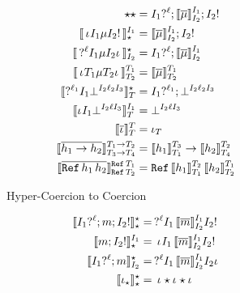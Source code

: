 \documentclass[acmtog, authorversion, acmlarge]{acmart}
\begin{document}
\begin{figure}[b]
\begin{subfigure}{.5\textwidth}
\begin{align*}
             {\Dyn} {\Dyn}
      &=
      \Seq{\prj[\I_1]{\Lbl}}
          {\Seq{\interpm{\Med}{\I_1}{\I_2}}{\inj[\I_2]}}
      \\
      \interp{\hc{\pmt}{\I_1}{\Med}{\I_2}{\inj}}{\I_1}{\Dyn}
      &=
      \Seq{\interpm{\Med}{\I_1}{\I_2}}{\inj[\I_2]}
      \\
      \interp{\hc{\prj{\Lbl}}{\I_1}{\Med}{\I_2}{\imt}}
             {\Dyn}{\I_2}
      &=
      \Seq{\prj[\I_1]{\Lbl}}{\interpm{\Med}{\I_1}{\I_2}}
      \\
      \interp{\hc{\pmt}{\T_1}{\Med}{\T_2}{\imt}}{\T_1}{\T_2}
      &= \interpm{\Med}{\T_1}{\T_2}
      \\
      \interp{\hcfail{\prj{\Lbl_1}}{\I_1}{\I_2}{\Lbl_2}{\I_3}}
             {\Dyn}{\T}
      &=
      \Seq{\prj[\I_1]{\Lbl_1}}{\failed{\I_2}{\Lbl_2}{\I_3}}
      \\
      \interp{\hcfail{\pmt}{\I_1}{\I_2}{\Lbl}{\I_3}}
             {\I_1}{\T}
             &=
      \failed{\I_2}{\Lbl}{\I_3}
      \\
      \interpm{\id}{\T}{\T} &= \id[\T]
      \\
      \interpm{\fn{\HC_1}{\HC_2}}
             {\Fn{\T_1}{\T_2}}{\Fn{\T_3}{\T_4}}
             &=
      \fn{\interp{\HC_1}{\T_3}{\T_1}}
         {\interp{\HC_2}{\T_2}{\T_4}}
      \\
      \interpm{\rf{\HC_1}{\HC_2}}
             {\Ref{\T_1}}{\Ref{\T_2}}
             &=
      \rf{\interp{\HC_1}{\T_2}{\T_1}}
         {\interp{\HC_2}{\T_1}{\T_2}}
    \end{align*}
    \caption{Hyper-Coercion to Coercion}
    \label{fig:h2c}
  \end{subfigure}%
    \begin{subfigure}{.5\textwidth}
      \begin{align*}
        \interp{\Seq{\prj[\I_1]{\Lbl}}
                    {\Seq{\Int}{\inj[\I_2]}}}
               {\Dyn}{\Dyn}
        &=
        \hc{\prj{\Lbl}}{\I_1}
           {\interpm{\Int}{\I_1}{\I_2}}
           {\I_2}{\inj}
      \\
      \interp{\Seq{\Int}{\inj[\I_2]}}{\I_1}{\Dyn}
      &=
      \hc{\pmt}{\I_1}
         {\interpm{\Int}{\I_1}{\I_2}}
         {\I_2}{\inj}
      \\
      \interp{\Seq{\prj[\I_1]{\Lbl}}{\Int}}
             {\Dyn}{\I_2}
      &=
       \hc{\prj{\Lbl}}{\I_1}
          {\interpm{\Int}{\I_1}{\I_2}}
          {\I_2}{\imt}
      \\
      \interp{\id[\Dyn]}{\Dyn}{\Dyn}
      &= \hc{\pmt}{\Dyn}{\id}{\Dyn}{\imt}

\end{align*}
\end{subfigure}
\end{figure}
\end{document}
